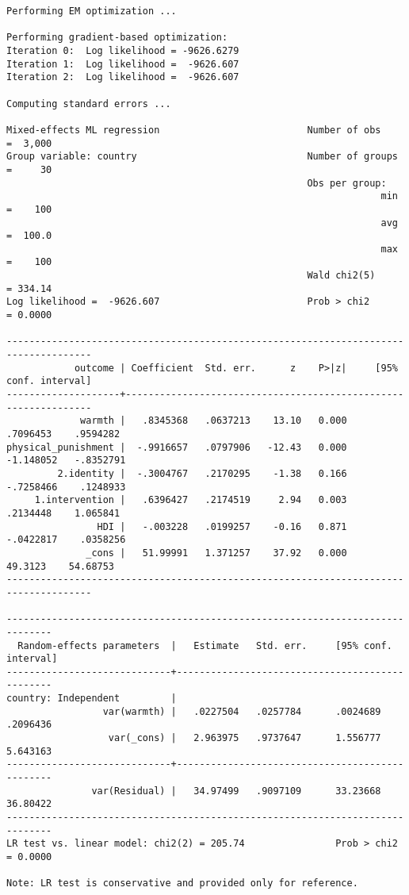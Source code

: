 \documentclass[
  letterpaper,
  DIV=11,
  numbers=noendperiod]{scrreprt}
\begin{document}
\begin{verbatim}
Performing EM optimization ...

Performing gradient-based optimization: 
Iteration 0:  Log likelihood = -9626.6279  
Iteration 1:  Log likelihood =  -9626.607  
Iteration 2:  Log likelihood =  -9626.607  

Computing standard errors ...

Mixed-effects ML regression                          Number of obs    =  3,000
Group variable: country                              Number of groups =     30
                                                     Obs per group:
                                                                  min =    100
                                                                  avg =  100.0
                                                                  max =    100
                                                     Wald chi2(5)     = 334.14
Log likelihood =  -9626.607                          Prob > chi2      = 0.0000

-------------------------------------------------------------------------------------
            outcome | Coefficient  Std. err.      z    P>|z|     [95% conf. interval]
--------------------+----------------------------------------------------------------
             warmth |   .8345368   .0637213    13.10   0.000     .7096453    .9594282
physical_punishment |  -.9916657   .0797906   -12.43   0.000    -1.148052   -.8352791
         2.identity |  -.3004767   .2170295    -1.38   0.166    -.7258466    .1248933
     1.intervention |   .6396427   .2174519     2.94   0.003     .2134448    1.065841
                HDI |   -.003228   .0199257    -0.16   0.871    -.0422817    .0358256
              _cons |   51.99991   1.371257    37.92   0.000      49.3123    54.68753
-------------------------------------------------------------------------------------

------------------------------------------------------------------------------
  Random-effects parameters  |   Estimate   Std. err.     [95% conf. interval]
-----------------------------+------------------------------------------------
country: Independent         |
                 var(warmth) |   .0227504   .0257784      .0024689    .2096436
                  var(_cons) |   2.963975   .9737647      1.556777    5.643163
-----------------------------+------------------------------------------------
               var(Residual) |   34.97499   .9097109      33.23668    36.80422
------------------------------------------------------------------------------
LR test vs. linear model: chi2(2) = 205.74                Prob > chi2 = 0.0000

Note: LR test is conservative and provided only for reference.
\end{verbatim}
\end{document}
